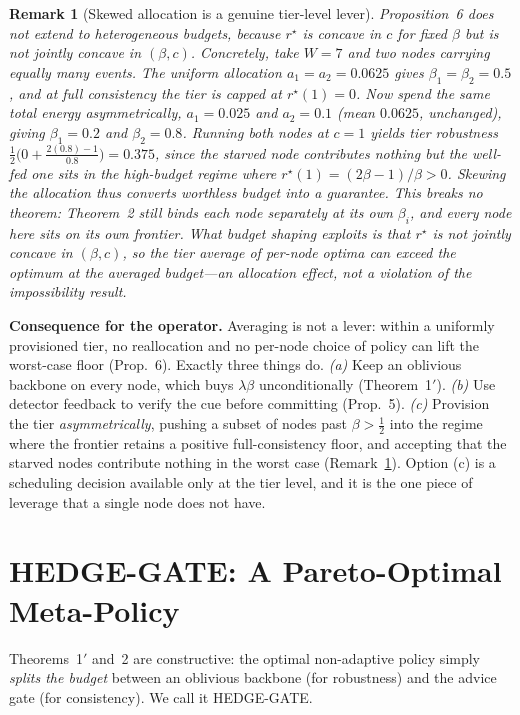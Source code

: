 ﻿\documentclass[lettersize,journal]{IEEEtran}
\newtheorem*{rem}{Remark}
\begin{document}
\begin{rem}[Skewed allocation is a genuine tier-level lever]\label{rem:skew}
Proposition~6 does \emph{not} extend to heterogeneous budgets, because $r^\star$ is concave in $c$ for fixed $\beta$ but is \emph{not} jointly concave in $(\beta,c)$. Concretely, take $W{=}7$ and two nodes carrying equally many events. The uniform allocation $a_1{=}a_2{=}0.0625$ gives $\beta_1{=}\beta_2{=}0.5$, and at full consistency the tier is capped at $r^\star(1)=0$. Now spend the \emph{same} total energy asymmetrically, $a_1{=}0.025$ and $a_2{=}0.1$ (mean $0.0625$, unchanged), giving $\beta_1{=}0.2$ and $\beta_2{=}0.8$. Running both nodes at $c{=}1$ yields tier robustness $\tfrac12\big(0+\tfrac{2(0.8)-1}{0.8}\big)=0.375$, since the starved node contributes nothing but the well-fed one sits in the high-budget regime where $r^\star(1)=(2\beta{-}1)/\beta>0$. Skewing the allocation thus converts worthless budget into a guarantee. \emph{This breaks no theorem}: Theorem~2 still binds each node separately at its own $\beta_i$, and every node here sits on its own frontier. What budget shaping exploits is that $r^\star$ is not jointly concave in $(\beta,c)$, so the tier average of per-node optima can exceed the optimum at the averaged budget---an allocation effect, not a violation of the impossibility result.
\end{rem}

\noindent\textbf{Consequence for the operator.} Averaging is not a lever: within a uniformly provisioned tier, no reallocation and no per-node choice of policy can lift the worst-case floor (Prop.~6). Exactly three things do. \emph{(a)} Keep an oblivious backbone on every node, which buys $\lambda\beta$ unconditionally (Theorem~1$'$). \emph{(b)} Use detector feedback to verify the cue before committing (Prop.~5). \emph{(c)} Provision the tier \emph{asymmetrically}, pushing a subset of nodes past $\beta>\tfrac12$ into the regime where the frontier retains a positive full-consistency floor, and accepting that the starved nodes contribute nothing in the worst case (Remark~\ref{rem:skew}). Option (c) is a scheduling decision available only at the tier level, and it is the one piece of leverage that a single node does not have.

\section{HEDGE-GATE: A Pareto-Optimal Meta-Policy}\label{sec:hedge}
Theorems~1$'$ and~2 are constructive: the optimal non-adaptive policy simply \emph{splits the budget} between an oblivious backbone (for robustness) and the advice gate (for consistency). We call it HEDGE-GATE.
\end{document}

